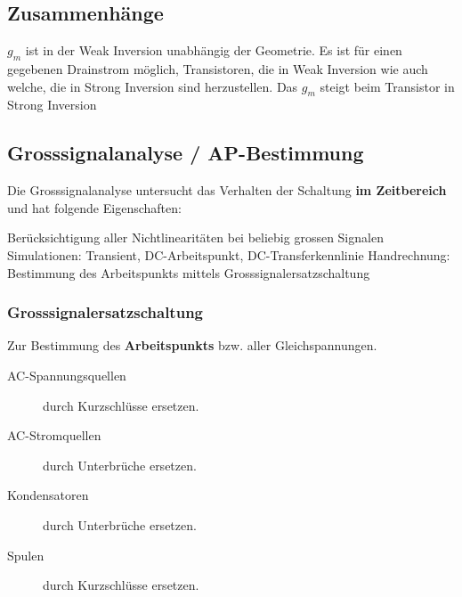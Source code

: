 
\subsection{Zusammenhänge}

$g_m$ ist in der Weak Inversion unabhängig der Geometrie. 
Es ist für einen gegebenen Drainstrom möglich, Transistoren, die in Weak Inversion wie auch welche, die in Strong Inversion sind herzustellen.
Das $g_m$ steigt beim Transistor in Strong Inversion 


\subsection{Grosssignalanalyse / AP-Bestimmung}
\label{Grosssignalanalyse / AP-Bestimmung}

Die Grosssignalanalyse untersucht das Verhalten der Schaltung \textbf{im Zeitbereich} und hat folgende Eigenschaften:

\smallskip

\begin{outline}
    \1 Berücksichtigung aller Nichtlinearitäten bei beliebig grossen Signalen
    \1 Simulationen: Transient, DC-Arbeitspunkt, DC-Transferkennlinie
    \1 Handrechnung: Bestimmung des Arbeitspunkts mittels Grosssignalersatzschaltung
\end{outline}


\subsubsection{Grosssignalersatzschaltung}
\label{Grosssignalersatzschaltung}

Zur Bestimmung des \textbf{Arbeitspunkts} bzw. aller Gleichspannungen.
\begin{description}
    \item[AC-Spannungsquellen] durch Kurzschlüsse ersetzen.
    \item[AC-Stromquellen] durch Unterbrüche ersetzen. 
    \item[Kondensatoren] durch Unterbrüche ersetzen.
    \item[Spulen] durch Kurzschlüsse ersetzen.  
\end{description}


